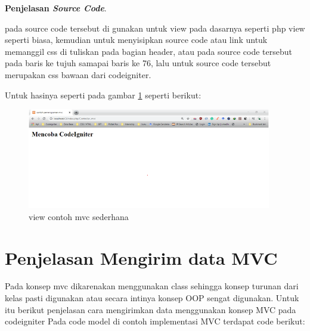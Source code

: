 \pagebreak
\textbf{Penjelasan \textit{Source Code}}.\par
pada source code tersebut di gunakan untuk view pada dasarnya seperti php view seperti biasa, kemudian untuk menyisipkan source code atau link untuk memanggil css di tuliskan pada bagian header, atau pada source code tersebut pada baris ke tujuh samapai baris ke 76, lalu untuk source code tersebut merupakan css bawaan dari codeigniter.

Untuk hasinya seperti pada gambar \ref{mvc7} seperti berikut:

\begin{figure}[h]
	\centerline{\includegraphics[width=0.95\textwidth]{figures/MVC/7.png}}
	\caption{view contoh mvc sederhana}
	\label{mvc7}
\end{figure}
 


\section{ Penjelasan Mengirim data MVC}

Pada konsep mvc dikarenakan menggunakan class sehingga konsep turunan dari kelas pasti digunakan atau secara intinya konsep OOP sengat digunakan. Untuk itu berikut penjelasan cara mengirimkan data menggunakan konsep MVC pada codeigniter 
	Pada code model di contoh implementasi MVC terdapat code berikut:\par

